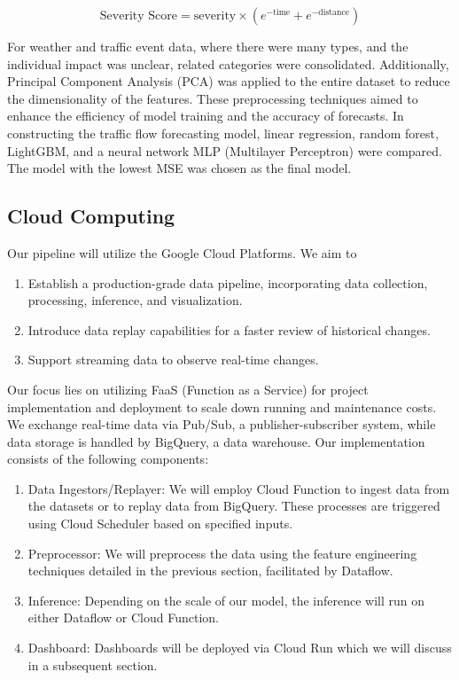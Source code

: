 \begin{equation}
    \text{Severity Score} = \text{severity} \times \left( e^{-\text{time}} + e^{-\text{distance}} \right)
\end{equation}

For weather and traffic event data, where there were many types, and the individual impact was unclear, related categories were consolidated. Additionally, Principal Component Analysis (PCA) was applied to the entire dataset to reduce the dimensionality of the features. These preprocessing techniques aimed to enhance the efficiency of model training and the accuracy of forecasts.
In constructing the traffic flow forecasting model, linear regression, random forest, LightGBM, and a neural network MLP (Multilayer Perceptron) were compared. The model with the lowest MSE was chosen as the final model.

\subsection{Cloud Computing}
 Our pipeline will utilize the Google Cloud Platforms. We aim to 
\begin{enumerate}
    \item Establish a production-grade data pipeline, incorporating data collection, processing, inference, and visualization.
    \item Introduce data replay capabilities for a faster review of historical changes.
    \item Support streaming data to observe real-time changes.
\end{enumerate}

Our focus lies on utilizing FaaS (Function as a Service) for project implementation and deployment to scale down running and maintenance costs. We exchange real-time data via Pub/Sub, a publisher-subscriber system, while data storage is handled by BigQuery, a data warehouse. Our implementation consists of the following components:

\begin{enumerate}
    \item Data Ingestors/Replayer: We will employ Cloud Function to ingest data from the datasets or to replay data from BigQuery. These processes are triggered using Cloud Scheduler based on specified inputs.
    \item Preprocessor: We will preprocess the data using the feature engineering techniques detailed in the previous section, facilitated by Dataflow.
    \item Inference: Depending on the scale of our model, the inference will run on either Dataflow or Cloud Function.
    \item Dashboard: Dashboards will be deployed via Cloud Run which we will discuss in a subsequent section.
\end{enumerate}

